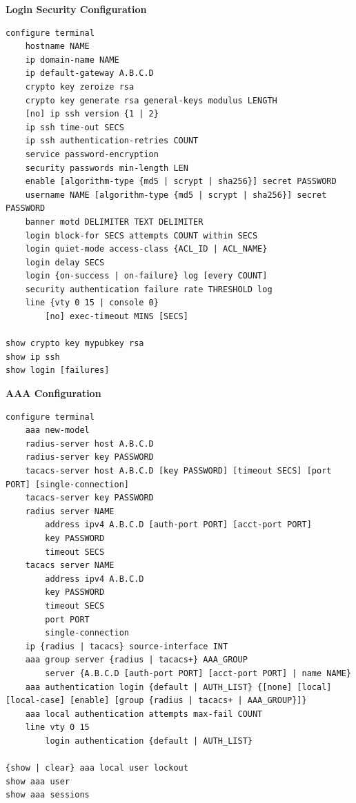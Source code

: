\documentclass[12pt]{article}
\begin{document}
	\textbf{Login Security Configuration}
	\begin{lstlisting}
configure terminal
	hostname NAME
	ip domain-name NAME
	ip default-gateway A.B.C.D
	crypto key zeroize rsa
	crypto key generate rsa general-keys modulus LENGTH
	[no] ip ssh version {1 | 2}
	ip ssh time-out SECS
	ip ssh authentication-retries COUNT
	service password-encryption
	security passwords min-length LEN
	enable [algorithm-type {md5 | scrypt | sha256}] secret PASSWORD
	username NAME [algorithm-type {md5 | scrypt | sha256}] secret PASSWORD
	banner motd DELIMITER TEXT DELIMITER
	login block-for SECS attempts COUNT within SECS
	login quiet-mode access-class {ACL_ID | ACL_NAME}
	login delay SECS
	login {on-success | on-failure} log [every COUNT]
	security authentication failure rate THRESHOLD log
	line {vty 0 15 | console 0}
		[no] exec-timeout MINS [SECS]

show crypto key mypubkey rsa
show ip ssh
show login [failures]
	\end{lstlisting}

	\textbf{AAA Configuration}
	\begin{lstlisting}
configure terminal
	aaa new-model
	radius-server host A.B.C.D
	radius-server key PASSWORD
	tacacs-server host A.B.C.D [key PASSWORD] [timeout SECS] [port PORT] [single-connection]
	tacacs-server key PASSWORD
	radius server NAME
		address ipv4 A.B.C.D [auth-port PORT] [acct-port PORT]
		key PASSWORD
		timeout SECS
	tacacs server NAME
		address ipv4 A.B.C.D
		key PASSWORD
		timeout SECS
		port PORT
		single-connection
	ip {radius | tacacs} source-interface INT
	aaa group server {radius | tacacs+} AAA_GROUP
		server {A.B.C.D [auth-port PORT] [acct-port PORT] | name NAME}
	aaa authentication login {default | AUTH_LIST} {[none] [local] [local-case] [enable] [group {radius | tacacs+ | AAA_GROUP}]}
	aaa local authentication attempts max-fail COUNT
	line vty 0 15
		login authentication {default | AUTH_LIST}

{show | clear} aaa local user lockout
show aaa user
show aaa sessions
	\end{lstlisting}
\end{document}
